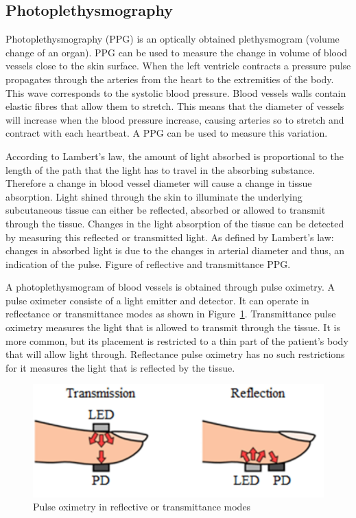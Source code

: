 \subsection{Photoplethysmography}
Photoplethysmography (PPG) is an optically obtained  plethysmogram (volume change of an organ). PPG can be used to measure the change in volume of blood vessels close to the skin surface. When the left ventricle contracts a pressure pulse propagates through the arteries from the heart to the extremities of the body. This wave corresponds to the systolic blood pressure. Blood vessels walls contain elastic fibres that allow them to stretch. This means that the diameter of vessels will increase when the blood pressure increase, causing   arteries so to stretch and contract with each heartbeat. A PPG can be used to measure this variation.

According to Lambert's law, the amount of light absorbed is proportional to the length of the path that the light has to travel in the absorbing substance. Therefore a change in blood vessel diameter will cause a change in tissue absorption. Light shined through the skin to illuminate the underlying subcutaneous tissue can either be reflected, absorbed or allowed to transmit through the tissue. Changes in the light absorption of the tissue can be detected by measuring this reflected or transmitted light. As defined by Lambert's law: changes in absorbed light is due to the changes in arterial diameter and thus, an indication of the pulse. Figure of reflective and transmittance PPG.

A photoplethysmogram of blood vessels is obtained through pulse oximetry. A pulse oximeter consiste of a light emitter and detector. It can operate in reflectance or transmittance modes as shown in Figure~\ref{fig:PulseOxiModes}. Transmittance pulse oximetry measures the light that is allowed to transmit through the tissue. It is more common, but its placement is restricted to a thin part of the patient's body that will allow light through. Reflectance pulse oximetry has no such restrictions for it measures the light that is reflected by the tissue.

\begin{figure}
   \centering
   \includegraphics[scale=1]{figs/PulseOxiModes}
   \caption{Pulse oximetry in reflective or transmittance modes}
   \label{fig:PulseOxiModes}
\end{figure}

